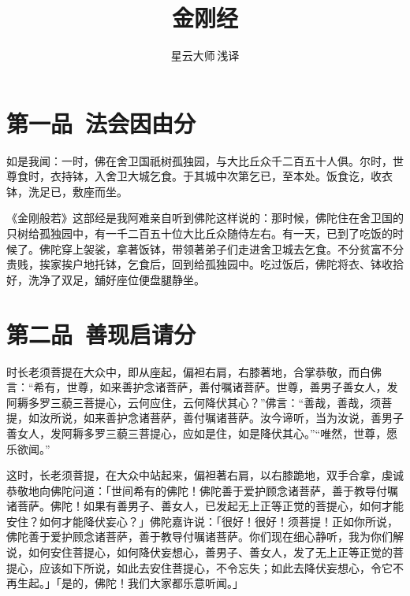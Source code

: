 \documentclass[12pt,twoside,openany]{book}
\title{金刚经}
\author{星云大师\,浅译}
\date{ }
\newcommand{\kai}[1]{{\CJKfamily{kai}#1}}
\begin{document}

\maketitle
\tableofcontents

\noindent


\chapter{第一品\ 法会因由分}
\begin{pinyinscope}
如是我闻：一时，佛在舍卫国祇树孤独园，与大比丘众千二百五十人俱。尔时，世尊食时，衣持钵，入舍卫大城乞食。于其城中次第乞已，至本处。饭食讫，收衣钵，洗足已，敷座而坐。
\end{pinyinscope}

\kai{《金刚般若》这部经是我阿难亲自听到佛陀这样说的：那时候，佛陀住在舍卫国的只树给孤独园中，有一千二百五十位大比丘众随侍左右。有一天，已到了吃饭的时候了。佛陀穿上袈裟，拿著饭钵，带领著弟子们走进舍卫城去乞食。不分贫富不分贵贱，挨家挨户地托钵，乞食后，回到给孤独园中。吃过饭后，佛陀将衣、钵收拾好，洗净了双足，舖好座位便盘腿静坐。}

\chapter{第二品\ 善现启请分}
\begin{pinyinscope}
时长老须菩提在大众中，即从座起，偏袒右肩，右膝著地，合掌恭敬，而白佛言：“希有，世尊，如来善护念诸菩萨，善付嘱诸菩萨。世尊，善男子善女人，发阿耨多罗三藐三菩提心，云何应住，云何降伏其心？”佛言：“善哉，善哉，须菩提，如汝所说，如来善护念诸菩萨，善付嘱诸菩萨。汝今谛听，当为汝说，善男子善女人，发阿耨多罗三藐三菩提心，应如是住，如是降伏其心。”“唯然，世尊，愿乐欲闻。”
\end{pinyinscope}

\kai{这时，长老须菩提，在大众中站起来，偏袒著右肩，以右膝跪地，双手合拿，虔诚恭敬地向佛陀问道：「世间希有的佛陀！佛陀善于爱护顾念诸菩萨，善于教导付嘱诸菩萨。佛陀！如果有善男子、善女人，已发起无上正等正觉的菩提心，如何才能安住？如何才能降伏妄心？」佛陀嘉许说：「很好！很好！须菩提！正如你所说，佛陀善于爱护顾念诸菩萨，善于教导付嘱诸菩萨。你们现在细心静听，我为你们解说，如何安住菩提心，如何降伏妄想心，善男子、善女人，发了无上正等正觉的菩提心，应该如下所说，如此去安住菩提心，不令忘失；如此去降伏妄想心，令它不再生起。」「是的，佛陀！我们大家都乐意听闻。」}
\end{document}
